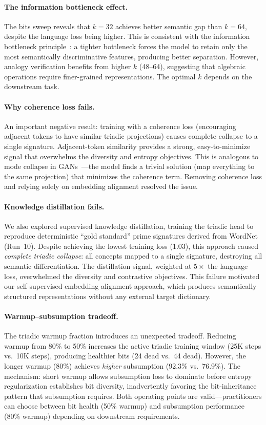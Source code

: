 \documentclass[11pt,a4paper]{article}
\begin{document}
\paragraph{The information bottleneck effect.}
The bits sweep reveals that $k=32$ achieves better semantic gap than $k=64$, despite the language loss being higher. This is consistent with the information bottleneck principle~\citep{tishby2000information}: a tighter bottleneck forces the model to retain only the most semantically discriminative features, producing better separation. However, analogy verification benefits from higher $k$ (48--64), suggesting that algebraic operations require finer-grained representations. The optimal $k$ depends on the downstream task.

\paragraph{Why coherence loss fails.}
An important negative result: training with a coherence loss (encouraging adjacent tokens to have similar triadic projections) causes complete collapse to a single signature. Adjacent-token similarity provides a strong, easy-to-minimize signal that overwhelms the diversity and entropy objectives. This is analogous to mode collapse in GANs~\citep{goodfellow2014gan}---the model finds a trivial solution (map everything to the same projection) that minimizes the coherence term. Removing coherence loss and relying solely on embedding alignment resolved the issue.

\paragraph{Knowledge distillation fails.}
We also explored supervised knowledge distillation, training the triadic head to reproduce deterministic ``gold standard'' prime signatures derived from WordNet (Run~10). Despite achieving the lowest training loss (1.03), this approach caused \emph{complete triadic collapse}: all concepts mapped to a single signature, destroying all semantic differentiation. The distillation signal, weighted at $5\times$ the language loss, overwhelmed the diversity and contrastive objectives. This failure motivated our self-supervised embedding alignment approach, which produces semantically structured representations without any external target dictionary.

\paragraph{Warmup--subsumption tradeoff.}
The triadic warmup fraction introduces an unexpected tradeoff. Reducing warmup from 80\% to 50\% increases the active triadic training window (25K steps vs.\ 10K steps), producing healthier bits (24 dead vs.\ 44 dead). However, the longer warmup (80\%) achieves \emph{higher} subsumption (92.3\% vs.\ 76.9\%). The mechanism: short warmup allows subsumption loss to dominate before entropy regularization establishes bit diversity, inadvertently favoring the bit-inheritance pattern that subsumption requires. Both operating points are valid---practitioners can choose between bit health (50\% warmup) and subsumption performance (80\% warmup) depending on downstream requirements.
\end{document}
